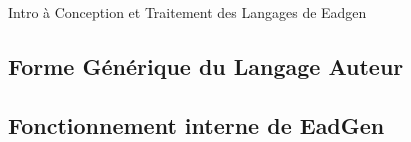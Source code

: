 Intro à Conception et Traitement des Langages de Eadgen

\subsection{Forme Générique du Langage Auteur}


\subsection{Fonctionnement interne de EadGen}


